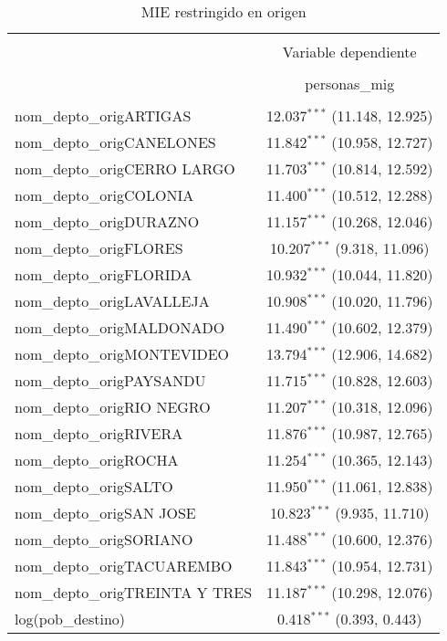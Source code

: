 
\begin{table}[H] \centering 
  \caption{MIE restringido en origen} 
  \label{} 
\begin{tabular}{@{\extracolsep{5pt}}lc} 
\\[-1.8ex]\hline 
\hline \\[-1.8ex] 
 & \multicolumn{1}{c}{Variable dependiente} \\ 
\cline{2-2} 
\\[-1.8ex] & personas\_mig \\ 
\hline \\[-1.8ex] 
 nom\_depto\_origARTIGAS & 12.037$^{***}$ (11.148, 12.925) \\ 
  nom\_depto\_origCANELONES & 11.842$^{***}$ (10.958, 12.727) \\ 
  nom\_depto\_origCERRO LARGO & 11.703$^{***}$ (10.814, 12.592) \\ 
  nom\_depto\_origCOLONIA & 11.400$^{***}$ (10.512, 12.288) \\ 
  nom\_depto\_origDURAZNO & 11.157$^{***}$ (10.268, 12.046) \\ 
  nom\_depto\_origFLORES & 10.207$^{***}$ (9.318, 11.096) \\ 
  nom\_depto\_origFLORIDA & 10.932$^{***}$ (10.044, 11.820) \\ 
  nom\_depto\_origLAVALLEJA & 10.908$^{***}$ (10.020, 11.796) \\ 
  nom\_depto\_origMALDONADO & 11.490$^{***}$ (10.602, 12.379) \\ 
  nom\_depto\_origMONTEVIDEO & 13.794$^{***}$ (12.906, 14.682) \\ 
  nom\_depto\_origPAYSANDU & 11.715$^{***}$ (10.828, 12.603) \\ 
  nom\_depto\_origRIO NEGRO & 11.207$^{***}$ (10.318, 12.096) \\ 
  nom\_depto\_origRIVERA & 11.876$^{***}$ (10.987, 12.765) \\ 
  nom\_depto\_origROCHA & 11.254$^{***}$ (10.365, 12.143) \\ 
  nom\_depto\_origSALTO & 11.950$^{***}$ (11.061, 12.838) \\ 
  nom\_depto\_origSAN JOSE & 10.823$^{***}$ (9.935, 11.710) \\ 
  nom\_depto\_origSORIANO & 11.488$^{***}$ (10.600, 12.376) \\ 
  nom\_depto\_origTACUAREMBO & 11.843$^{***}$ (10.954, 12.731) \\ 
  nom\_depto\_origTREINTA Y TRES & 11.187$^{***}$ (10.298, 12.076) \\ 
  log(pob\_destino) & 0.418$^{***}$ (0.393, 0.443) \\ 

\end{tabular}
\end{table}
